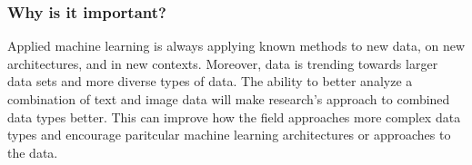 \subsubsection{Why is it important?}

Applied machine learning is always applying known methods to new data, on new architectures, and in new contexts.  Moreover, data is trending towards larger data sets and more diverse types of data.  The ability to better analyze a combination of text and image data will make research's approach to combined data types better.  This can improve how the field approaches more complex data types and encourage paritcular machine learning architectures or approaches to the data.
